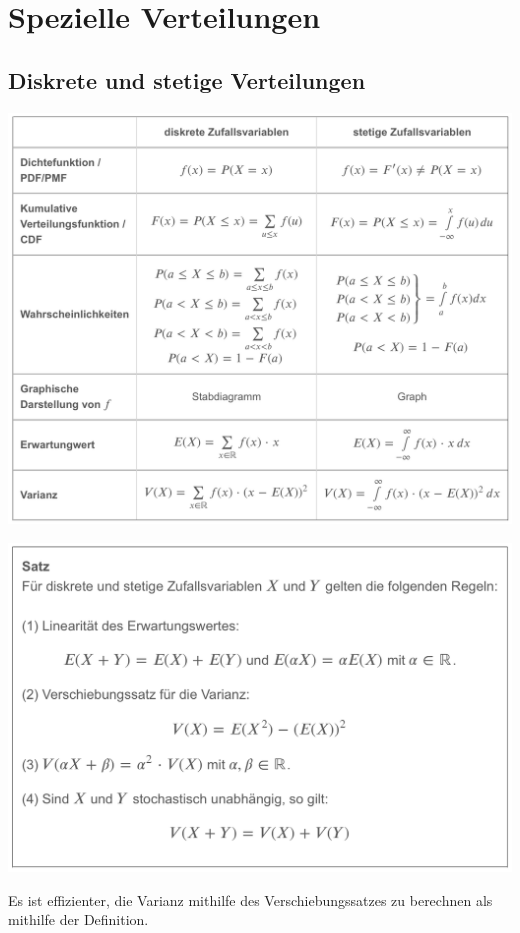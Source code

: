 \section{Spezielle Verteilungen}
\label{sec:spezielle_verteilungen}
\subsection{Diskrete und stetige Verteilungen}
\label{subsec:diskrete_stetige_verteilungen}
\begin{center}
    \includegraphics[width=1\linewidth]{images/tabelle1.png}
\end{center}
\begin{center}
    \includegraphics[width=0.8\linewidth]{images/satz.png}
\end{center}
Es ist effizienter, die Varianz mithilfe des Verschiebungssatzes zu berechnen als mithilfe der Definition.
